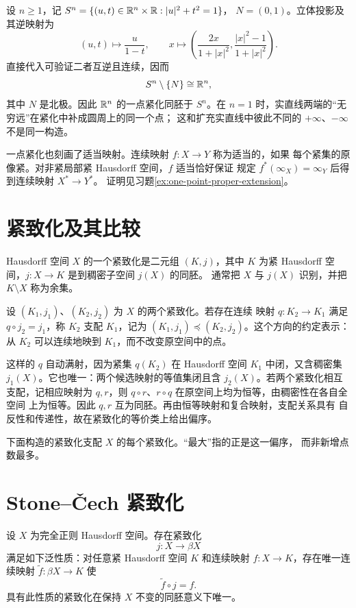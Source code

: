 \begin{example}
设 \(n\ge1\)，记 \(S^n=\{(u,t)\in\mathbb{R}^n\times\mathbb{R}:|u|^2+t^2=1\}\)，
\(N=(0,1)\)。立体投影及其逆映射为
\[
 (u,t)\longmapsto\frac{u}{1-t},\qquad
 x\longmapsto\left(\frac{2x}{1+|x|^2},
                    \frac{|x|^2-1}{1+|x|^2}\right).
\]
直接代入可验证二者互逆且连续，因而
\[
 S^n\setminus\{N\}\cong\mathbb{R}^n,
\]
其中 \(N\) 是北极。因此 \(\mathbb{R}^n\) 的一点紧化同胚于 \(S^n\)。在
\(n=1\) 时，实直线两端的“无穷远”在紧化中补成圆周上的同一个点；
这和扩充实直线中彼此不同的 \(+\infty\)、\(-\infty\) 不是同一构造。
\end{example}

一点紧化也刻画了适当映射。连续映射 \(f:X\to Y\) 称为适当的，如果
每个紧集的原像紧。对非紧局部紧 Hausdorff 空间，\(f\) 适当恰好保证
规定 \(f^*(\infty_X)=\infty_Y\) 后得到连续映射 \(X^*\to Y^*\)。
证明见习题\ref{ex:one-point-proper-extension}。

\section{紧致化及其比较}

\begin{definition}[紧致化]
Hausdorff 空间 \(X\) 的一个紧致化是二元组 \((K,j)\)，其中 \(K\) 为紧
Hausdorff 空间，\(j:X\to K\) 是到稠密子空间 \(j(X)\) 的同胚。
通常把 \(X\) 与 \(j(X)\) 识别，并把 \(K\setminus X\) 称为余集。
\end{definition}

设 \((K_1,j_1)\)、\((K_2,j_2)\) 为 \(X\) 的两个紧致化。若存在连续
映射 \(q:K_2\to K_1\) 满足 \(q\circ j_2=j_1\)，称 \(K_2\) 支配
\(K_1\)，记为 \((K_1,j_1)\preccurlyeq(K_2,j_2)\)。这个方向的约定表示：
从 \(K_2\) 可以连续地映到 \(K_1\)，而不改变原空间中的点。

这样的 \(q\) 自动满射，因为紧集 \(q(K_2)\) 在 Hausdorff 空间 \(K_1\)
中闭，又含稠密集 \(j_1(X)\)。它也唯一：两个候选映射的等值集闭且含
\(j_2(X)\)。若两个紧致化相互支配，记相应映射为 \(q,r\)，则
\(q\circ r\)、\(r\circ q\) 在原空间上均为恒等，由稠密性在各自全空间
上为恒等。因此 \(q,r\) 互为同胚。再由恒等映射和复合映射，支配关系具有
自反性和传递性，故在紧致化的等价类上给出偏序。

下面构造的紧致化支配 \(X\) 的每个紧致化。“最大”指的正是这一偏序，
而非新增点数最多。

\section{Stone--Čech 紧致化}

\begin{theorem}
\label{thm:stone-cech-compactification}
设 \(X\) 为完全正则 Hausdorff 空间。存在紧致化
\[
 j:X\longrightarrow\beta X
\]
满足如下泛性质：对任意紧 Hausdorff 空间 \(K\) 和连续映射
\(f:X\to K\)，存在唯一连续映射
\(\widetilde f:\beta X\to K\) 使
\[
 \widetilde f\circ j=f.
\]
具有此性质的紧致化在保持 \(X\) 不变的同胚意义下唯一。
\end{theorem}

